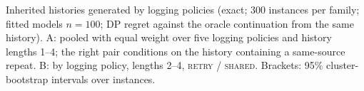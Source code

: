 \begin{table}[!htbp]
\centering\scriptsize\setlength{\tabcolsep}{3pt}
\caption{Inherited histories generated by logging policies (exact; 300 instances per family; fitted models $n{=}100$; DP regret against the oracle continuation from the same history). A: pooled with equal weight over five logging policies and history lengths 1--4; the right pair conditions on the history containing a same-source repeat. B: by logging policy, lengths 2--4, \textsc{retry} / \textsc{shared}. Brackets: 95\% cluster-bootstrap intervals over instances.}
\label{tab:app-d6}

\end{table}
